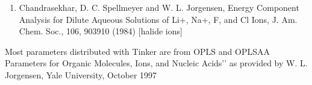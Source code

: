 \documentclass[letterpaper,11pt,english]{sphinxmanual}
\begin{document}
\begin{enumerate}
%
\setcounter{enumi}{9}
\item {} 
Chandrasekhar, D. C. Spellmeyer and W. L. Jorgensen, Energy Component Analysis for Dilute Aqueous Solutions of Li+, Na+, F\sphinxhyphen{}, and Cl\sphinxhyphen{} Ions, J. Am. Chem. Soc., 106, 903\sphinxhyphen{}910 (1984)  {[}halide ions{]}

\end{enumerate}

Most parameters distributed with Tinker are from {\color{red}\bfseries{}\textasciigrave{}\textasciigrave{}}OPLS and OPLS\sphinxhyphen{}AA Parameters for Organic Molecules, Ions, and Nucleic Acids’’ as provided by W. L. Jorgensen, Yale University, October 1997

\end{document}
